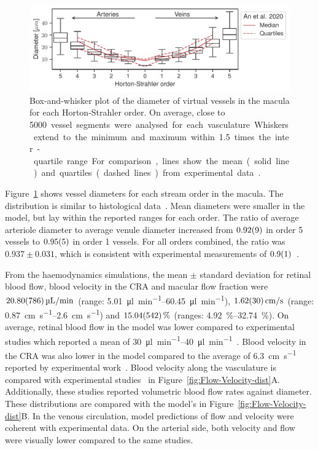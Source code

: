 \documentclass[11pt,]{article}
\begin{document}
\begin{figure}[ht!]
  \centering
  \includegraphics[width=.95\textwidth]{Horton_Strahler_Diameter_Distribution}
  \caption{\label{fig:Horton_Strahler}Box-and-whisker plot of the diameter of virtual vessels in the macula for each Horton-Strahler order. On average, close to \SI{5000} vessel segments were analysed for each vasculature. Whiskers extend to the minimum and maximum within \SI{1.5}{} times the inter-quartile range. For comparison, lines show the mean (solid line) and quartiles (dashed lines) from experimental data\cite{An2020}.}  
\end{figure}

Figure~\ref{fig:Horton_Strahler} shows vessel diameters for each stream order in the macula.
The distribution is similar to histological data~\cite{An2020}.
Mean diameters were smaller in the model, but lay within the reported ranges for each order.
The ratio of average arteriole diameter to average venule diameter increased from $\SI{0.92\pm 0.09}{}$ in order 5 vessels to $\SI{0.95\pm0.05}{}$ in order 1 vessels.
For all orders combined, the ratio was $0.937\pm0.031$, which is consistent with experimental measurements of $\SI{0.9\pm0.1}{}$~\cite{Goldenberg2013}.  

From the haemodynamics simulations, the mean $\pm$ standard deviation for retinal blood flow, blood velocity in the CRA and macular flow fraction were $\SI[per-mode=symbol]{20.8\pm7.86}{\micro\litre\per\minute}$ (range: \SIrange[per-mode=symbol]{5.01}{60.45}{\micro\litre\per\minute}), $\SI[per-mode=symbol]{1.62\pm0.30}{\cm\per\second}$ (range: \SIrange[per-mode=symbol]{0.87}{2.6}{\cm\per\second}) and $\SI{15.04\pm5.42}{\percent}$ (ranges: \SIrange{4.92}{32.74}{\percent}).
On average, retinal blood flow in the model was lower compared to experimental studies which reported a mean of \SIrange{30}{40}{\micro\litre\per\minute}~\cite{DoblhoffDier2014,Riva1985}.
Blood velocity in the CRA was also lower in the model compared to the average of \SI{6.3}{\cm\per\second} reported by experimental work~\cite{Dorner2009}.
Blood velocity along the vasculature is compared with experimental studies~\cite{DoblhoffDier2014,Riva1985} in Figure~\ref{fig:Flow-Velocity-dist}A.
Additionally, these studies reported volumetric blood flow rates against diameter.
These distributions are compared with the model's in Figure~\ref{fig:Flow-Velocity-dist}B.
In the venous circulation, model predictions of flow and velocity were coherent with experimental data.
On the arterial side, both velocity and flow were visually lower compared to the same studies.
\end{document}
